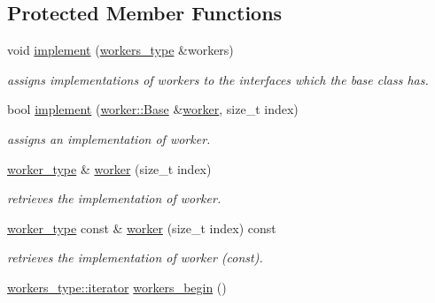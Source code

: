 \subsection*{Protected Member Functions}
\begin{DoxyCompactItemize}
\item 
\hypertarget{group__task_gaf3c6d1475b000e7f2cf6b7448fc2dfdc}{void \hyperlink{group__task_gaf3c6d1475b000e7f2cf6b7448fc2dfdc}{implement} (\hyperlink{classhryky_1_1_vector}{workers\-\_\-type} \&workers)}\label{group__task_gaf3c6d1475b000e7f2cf6b7448fc2dfdc}

\begin{DoxyCompactList}\small\item\em assigns implementations of workers to the interfaces which the base class has. \end{DoxyCompactList}\item 
bool \hyperlink{classhryky_1_1task_1_1distributor_1_1_base_aaed765a0ab4b2f79082ca8b66251dc7a}{implement} (\hyperlink{classhryky_1_1task_1_1worker_1_1_base}{worker\-::\-Base} \&\hyperlink{classhryky_1_1task_1_1distributor_1_1_impl_ada35bdee49d5012cd0bc8bd398278afd}{worker}, size\-\_\-t index)
\begin{DoxyCompactList}\small\item\em assigns an implementation of worker. \end{DoxyCompactList}\item 
\hypertarget{classhryky_1_1task_1_1distributor_1_1_impl_ada35bdee49d5012cd0bc8bd398278afd}{\hyperlink{classhryky_1_1task_1_1worker_1_1_base}{worker\-\_\-type} \& \hyperlink{classhryky_1_1task_1_1distributor_1_1_impl_ada35bdee49d5012cd0bc8bd398278afd}{worker} (size\-\_\-t index)}\label{classhryky_1_1task_1_1distributor_1_1_impl_ada35bdee49d5012cd0bc8bd398278afd}

\begin{DoxyCompactList}\small\item\em retrieves the implementation of worker. \end{DoxyCompactList}\item 
\hypertarget{classhryky_1_1task_1_1distributor_1_1_impl_a8b3195bf033c49aba3471b44744951e0}{\hyperlink{classhryky_1_1task_1_1worker_1_1_base}{worker\-\_\-type} const \& \hyperlink{classhryky_1_1task_1_1distributor_1_1_impl_a8b3195bf033c49aba3471b44744951e0}{worker} (size\-\_\-t index) const}\label{classhryky_1_1task_1_1distributor_1_1_impl_a8b3195bf033c49aba3471b44744951e0}

\begin{DoxyCompactList}\small\item\em retrieves the implementation of worker (const). \end{DoxyCompactList}\item 
\hypertarget{classhryky_1_1task_1_1distributor_1_1_impl_a99b4191fe1abb7aa61d4083b0a79bfc0}{\hyperlink{classhryky_1_1iterator_1_1random_1_1_mutable}{workers\-\_\-type\-::iterator} \hyperlink{classhryky_1_1task_1_1distributor_1_1_impl_a99b4191fe1abb7aa61d4083b0a79bfc0}{workers\-\_\-begin} ()}\label{classhryky_1_1task_1_1distributor_1_1_impl_a99b4191fe1abb7aa61d4083b0a79bfc0}


\end{DoxyCompactItemize}
